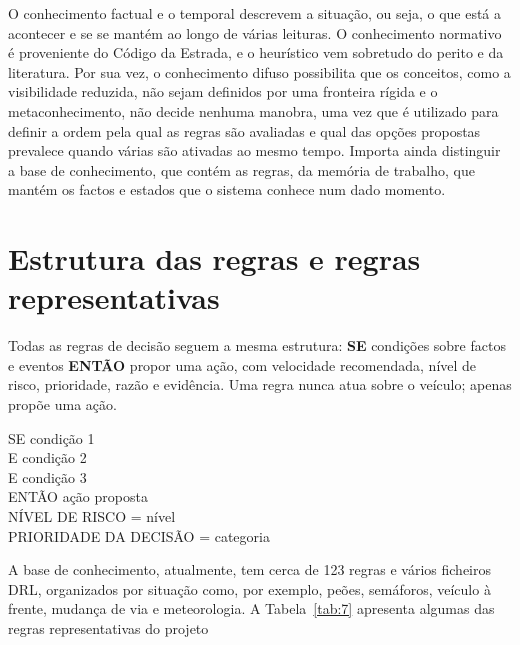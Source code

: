 O conhecimento factual e o temporal descrevem a situação, ou seja, o que está a acontecer e se se mantém ao longo de várias leituras. O conhecimento normativo é proveniente do Código da Estrada, e o heurístico vem sobretudo do perito e da literatura. Por sua vez, o conhecimento difuso possibilita que os conceitos, como a visibilidade reduzida, não sejam definidos por uma fronteira rígida e o metaconhecimento, não decide nenhuma manobra, uma vez que é utilizado para definir a ordem pela qual as regras são avaliadas e qual das opções propostas prevalece quando várias são ativadas ao mesmo tempo. Importa ainda distinguir a base de conhecimento, que contém as regras, da memória de trabalho, que mantém os factos e estados que o sistema conhece num dado momento.

\section{Estrutura das regras e regras representativas}\label{sec:4.3}

Todas as regras de decisão seguem a mesma estrutura: \textbf{SE} condições sobre factos e eventos \textbf{ENTÃO} propor uma ação, com velocidade recomendada, nível de risco, prioridade, razão e evidência. Uma regra nunca atua sobre o veículo; apenas propõe uma ação.

\begin{caixaregra}
SE    condição 1\\
E     condição 2\\
E     condição 3\\
ENTÃO ação proposta\\
\hspace*{3.2em}NÍVEL DE RISCO = nível\\
\hspace*{3.2em}PRIORIDADE DA DECISÃO = categoria
\end{caixaregra}

A base de conhecimento, atualmente, tem cerca de 123 regras e vários ficheiros DRL, organizados por situação como, por exemplo, peões, semáforos, veículo à frente, mudança de via e meteorologia. A Tabela~\ref{tab:7} apresenta algumas das regras representativas do projeto

